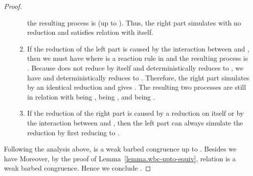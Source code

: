 \documentclass{LMCS}
\newcommand{\forget}[1]{}
\renewcommand{\_}{\mathord{\rule[-.25ex]{1ex}{.15ex}}}
\begin{document}
\begin{proof}
\begin{enumerate}[]
\begin{enumerate}[]
      the resulting process
      is  (up to ).
      Thus, the right part simulates
      with no reduction and  satisfies
      relation  with itself.
    \item If the reduction of the left part is caused by the
      interaction between  and , then we must have  where  is a reaction
      rule in  and the resulting process is
      . Because 
      does not reduce by itself and  deterministically reduces to
      , we have  and 
      deterministically reduces to . Therefore, the right part
      simulates by an identical reduction and gives
      . The resulting two
      processes are still in relation  with  being
      ,  being , and  being .
    \item If the reduction of the right part is caused by a reduction
      on  itself or by the interaction between  and , then
      the left part can always simulate the reduction by first
      reducing  to
      .
    \end{enumerate}
  \end{enumerate}
  Following the analysis above,  is a weak barbed congruence up to
  . Besides we have 
  Moreover, by the proof of Lemma~\ref{lemma.wbc-upto-equiv},
  relation  is a weak barbed congruence. Hence we conclude
  . \forget{\qed}
\end{proof}
\end{document}
